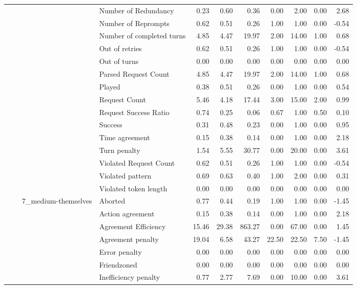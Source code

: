 \begin{tabular}{llllrrrrrrr}
 &  &  & Number of Redundancy & 0.23 & 0.60 & 0.36 & 0.00 & 2.00 & 0.00 & 2.68 \\
 &  &  & Number of Reprompts & 0.62 & 0.51 & 0.26 & 1.00 & 1.00 & 0.00 & -0.54 \\
 &  &  & Number of completed turns & 4.85 & 4.47 & 19.97 & 2.00 & 14.00 & 1.00 & 0.68 \\
 &  &  & Out of retries & 0.62 & 0.51 & 0.26 & 1.00 & 1.00 & 0.00 & -0.54 \\
 &  &  & Out of turns & 0.00 & 0.00 & 0.00 & 0.00 & 0.00 & 0.00 & 0.00 \\
 &  &  & Parsed Request Count & 4.85 & 4.47 & 19.97 & 2.00 & 14.00 & 1.00 & 0.68 \\
 &  &  & Played & 0.38 & 0.51 & 0.26 & 0.00 & 1.00 & 0.00 & 0.54 \\
 &  &  & Request Count & 5.46 & 4.18 & 17.44 & 3.00 & 15.00 & 2.00 & 0.99 \\
 &  &  & Request Success Ratio & 0.74 & 0.25 & 0.06 & 0.67 & 1.00 & 0.50 & 0.10 \\
 &  &  & Success & 0.31 & 0.48 & 0.23 & 0.00 & 1.00 & 0.00 & 0.95 \\
 &  &  & Time agreement & 0.15 & 0.38 & 0.14 & 0.00 & 1.00 & 0.00 & 2.18 \\
 &  &  & Turn penalty & 1.54 & 5.55 & 30.77 & 0.00 & 20.00 & 0.00 & 3.61 \\
 &  &  & Violated Request Count & 0.62 & 0.51 & 0.26 & 1.00 & 1.00 & 0.00 & -0.54 \\
 &  &  & Violated pattern & 0.69 & 0.63 & 0.40 & 1.00 & 2.00 & 0.00 & 0.31 \\
 &  &  & Violated token length & 0.00 & 0.00 & 0.00 & 0.00 & 0.00 & 0.00 & 0.00 \\
\cline{3-11}
 &  & \multirow[t]{27}{*}{7_medium-themselves} & Aborted & 0.77 & 0.44 & 0.19 & 1.00 & 1.00 & 0.00 & -1.45 \\
 &  &  & Action agreement & 0.15 & 0.38 & 0.14 & 0.00 & 1.00 & 0.00 & 2.18 \\
 &  &  & Agreement Efficiency & 15.46 & 29.38 & 863.27 & 0.00 & 67.00 & 0.00 & 1.45 \\
 &  &  & Agreement penalty & 19.04 & 6.58 & 43.27 & 22.50 & 22.50 & 7.50 & -1.45 \\
 &  &  & Error penalty & 0.00 & 0.00 & 0.00 & 0.00 & 0.00 & 0.00 & 0.00 \\
 &  &  & Friendzoned & 0.00 & 0.00 & 0.00 & 0.00 & 0.00 & 0.00 & 0.00 \\
 &  &  & Inefficiency penalty & 0.77 & 2.77 & 7.69 & 0.00 & 10.00 & 0.00 & 3.61 \\

\end{tabular}
